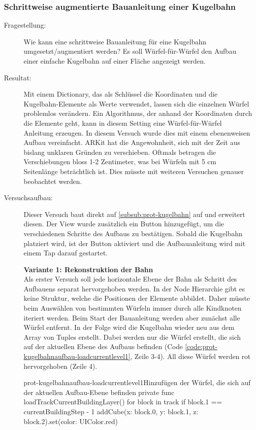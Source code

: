\subsubsection{Schrittweise augmentierte Bauanleitung einer Kugelbahn}\label{subsub:prot-kugelbahnaufbau}
\begin{description}
	\item[Fragestellung:] Wie kann eine schrittweise Bauanleitung für eine Kugelbahn umgesetzt/augmentiert werden? Es soll Würfel-für-Würfel den Aufbau einer einfache Kugelbahn auf einer Fläche angezeigt werden.
	\item[Resultat:] Mit einem Dictionary, das als Schlüssel die Koordinaten und die Kugelbahn-Elemente als Werte verwendet, lassen sich die einzelnen Würfel problemlos verändern. Ein Algorithmus, der anhand der Koordinaten durch die Elemente geht, kann in diesem Setting eine Würfel-für-Würfel Anleitung erzeugen. In diesem Versuch wurde dies mit einem ebenenweisen Aufbau vereinfacht. ARKit hat die Angewohnheit, sich mit der Zeit aus bislang unklaren Gründen zu verschieben. Oftmals betragen die Verschiebungen bloss 1-2 Zentimeter, was bei Würfeln mit 5 cm Seitenlänge beträchtlich ist. Dies müsste mit weiteren Versuchen genauer beobachtet werden.
	\item[Versuchsaufbau:] Dieser Versuch baut direkt auf \ref{subsub:prot-kugelbahn} auf und erweitert diesen. Der View wurde zusätzlich ein Button hinzugefügt, um die verschiedenen Schritte des Aufbaus zu bestätigen. Sobald die Kugelbahn platziert wird, ist der Button aktiviert und die Aufbauanleitung wird mit einem Tap darauf gestartet.

	\textbf{Variante 1: Rekonstruktion der Bahn}\\
	Als erster Versuch soll jede horizontale Ebene der Bahn als Schritt des Aufbauens separat hervorgehoben werden. In der Node Hierarchie gibt es keine Struktur, welche die Positionen der Elemente abbildet. Daher müsste beim Auswählen von bestimmten Würfeln immer durch alle Kindknoten iteriert werden. Beim Start der Bauanleitung werden aber zunächst alle Würfel entfernt. In der Folge wird die Kugelbahn wieder neu aus dem Array von Tuples erstellt. Dabei werden nur die Würfel erstellt, die sich auf der aktuellen Ebene des Aufbaus befinden (Code \ref{code:prot-kugelbahnaufbau-loadcurrentlevel1}, Zeile 3-4). All diese Würfel werden rot hervorgehoben (Zeile 4).

	\begin{code}{prot-kugelbahnaufbau-loadcurrentlevel1}{Hinzufügen der Würfel, die sich auf der aktuellen Aufbau-Ebene befinden}
		private func loadTrackCurrentBuildingLayer() {
			for block in track {
				if block.1 == currentBuildingStep - 1 {
					addCube(x: block.0, y: block.1, z: block.2).set(color: UIColor.red)
				}
			}
		}
	\end{code}


\end{description}

